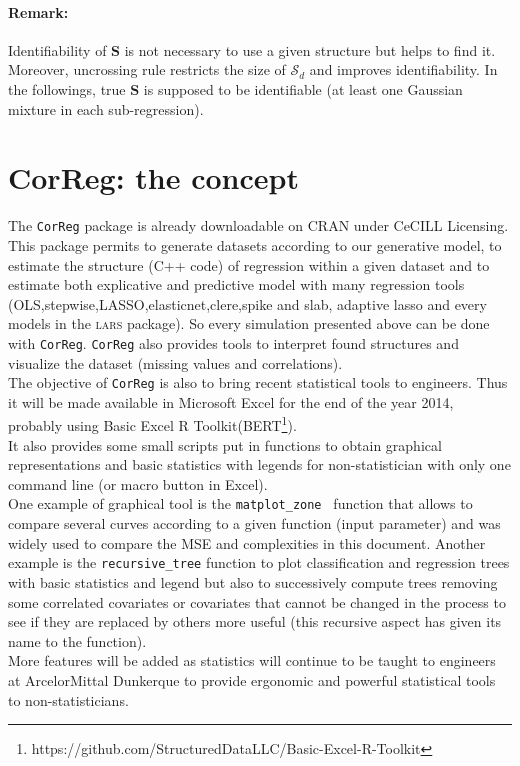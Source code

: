 \documentclass[12pt,a4paper]{report}
\begin{document}
	
\paragraph{Remark:} Identifiability of $\boldsymbol{S}$ is not necessary to use a given structure but helps to find it. Moreover, uncrossing rule restricts the size of $\mathcal{S}_d$ and improves identifiability.
In the followings, true $\boldsymbol{S}$ is supposed to be identifiable (at least one Gaussian mixture in each sub-regression).
	
	
\section{CorReg: the concept}	
	
		The {\tt CorReg} package is already downloadable on CRAN under CeCILL Licensing. This package permits to generate datasets according to our generative model, to estimate the structure (C++ code) of regression within a given dataset and to estimate both explicative and predictive model with many regression tools (OLS,stepwise,LASSO,elasticnet,clere,spike and slab, adaptive lasso and every models in the \textsc{lars} package). So every simulation presented above can be done with {\tt CorReg}.
	{\tt CorReg} also provides tools to interpret found structures and visualize the dataset (missing values and correlations). \\%
	The objective of {\tt CorReg} is also to bring recent statistical tools to engineers. Thus it will be made available in Microsoft Excel for the end of the year 2014, probably using Basic Excel R Toolkit(BERT\footnote{https://github.com/StructuredDataLLC/Basic-Excel-R-Toolkit}). \\
	
	It also provides some small scripts put in functions to obtain graphical representations and basic statistics with legends for non-statistician with only one command line (or macro button in Excel).\\
	 One example of graphical tool is the {\tt matplot\_zone } function that allows to compare several curves according to a given function (input parameter) and was widely used to compare the MSE and complexities in this document. Another example is the {\tt recursive\_tree} function to plot classification and regression trees with basic statistics and legend but also to successively compute trees removing some correlated covariates or covariates that cannot be changed in the process to see if they are replaced by others more useful (this recursive aspect has given its name to the function).\\
	 
	More features will be added as statistics will continue to be taught to engineers at ArcelorMittal Dunkerque to provide ergonomic and powerful statistical tools to non-statisticians. 	
	
\end{document}

